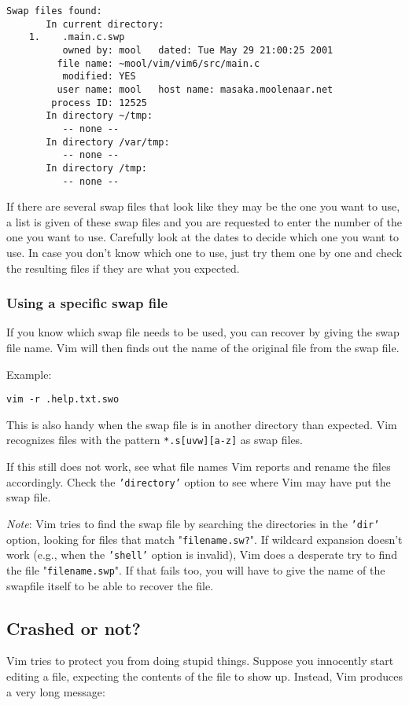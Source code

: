 \begin{Verbatim}[samepage=true]
    Swap files found: 
       In current directory: 
    1.    .main.c.swp 
          owned by: mool   dated: Tue May 29 21:00:25 2001 
         file name: ~mool/vim/vim6/src/main.c 
          modified: YES 
         user name: mool   host name: masaka.moolenaar.net 
        process ID: 12525 
       In directory ~/tmp: 
          -- none -- 
       In directory /var/tmp: 
          -- none -- 
       In directory /tmp: 
          -- none -- 
\end{Verbatim}

If there are several swap files that look like they may be the one you want to use, a list is given of these swap files and you are requested to enter the number of the one you want to use.
Carefully look at the dates to decide which one you want to use.
In case you don't know which one to use, just try them one by one and check the resulting files if they are what you expected.

\subsubsection{Using a specific swap file}
If you know which swap file needs to be used, you can recover by giving the swap file name.
Vim will then finds out the name of the original file from the swap file.

Example:
\begin{Verbatim}[samepage=true]
 vim -r .help.txt.swo
\end{Verbatim}

This is also handy when the swap file is in another directory than expected.
Vim recognizes files with the pattern \texttt{*.s[uvw][a-z]} as swap files.

If this still does not work, see what file names Vim reports and rename the files accordingly.
Check the \texttt{'directory'} option to see where Vim may have put the swap file.

\emph{Note}: Vim tries to find the swap file by searching the directories in the \texttt{'dir'} option, looking for files that match "\texttt{filename.sw?}".
If wildcard expansion doesn't work (e.g., when the \texttt{'shell'} option is invalid), Vim does a desperate try to find the file "\texttt{filename.swp}".
If that fails too, you will have to give the name of the swapfile itself to be able to recover the file.
\subsection{Crashed or not?}
\label{ATTENTION}
\label{E325}
Vim tries to protect you from doing stupid things.
Suppose you innocently start editing a file, expecting the contents of the file to show up.
Instead, Vim produces a very long message:

